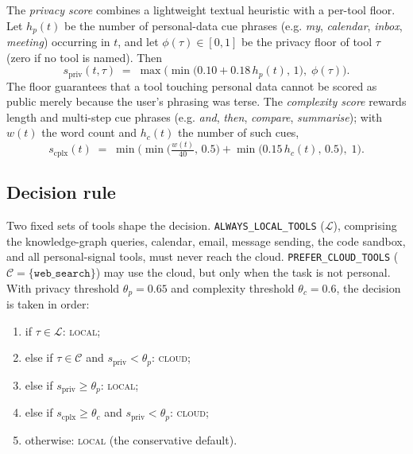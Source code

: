 \documentclass{ecai}
\begin{document}
The \emph{privacy score} combines a lightweight textual heuristic with a
per-tool floor. Let $h_p(t)$ be the number of personal-data cue phrases (e.g.
\emph{my}, \emph{calendar}, \emph{inbox}, \emph{meeting}) occurring in $t$, and
let $\phi(\tau)\in[0,1]$ be the privacy floor of tool $\tau$ (zero if no tool is
named). Then
%
\begin{equation}\label{eq:priv}
s_{\mathrm{priv}}(t,\tau) \;=\;
\max\!\Big(\min\big(0.10 + 0.18\,h_p(t),\,1\big),\; \phi(\tau)\Big).
\end{equation}
%
The floor guarantees that a tool touching personal data cannot be scored as
public merely because the user's phrasing was terse. The \emph{complexity score}
rewards length and multi-step cue phrases (e.g. \emph{and}, \emph{then},
\emph{compare}, \emph{summarise}); with $w(t)$ the word count and $h_c(t)$ the
number of such cues,
%
\begin{equation}\label{eq:cplx}
s_{\mathrm{cplx}}(t) \;=\;
\min\!\Big(\min\big(\tfrac{w(t)}{40},\,0.5\big)
        + \min\big(0.15\,h_c(t),\,0.5\big),\; 1\Big).
\end{equation}

\subsection{Decision rule}

Two fixed sets of tools shape the decision. \texttt{ALWAYS\_LOCAL\_TOOLS}
($\mathcal{L}$), comprising the knowledge-graph queries, calendar, email, message
sending, the code sandbox, and all personal-signal tools, must never reach
the cloud. \texttt{PREFER\_CLOUD\_TOOLS} ($\mathcal{C}=\{\texttt{web\_search}\}$)
may use the cloud, but only when the task is not personal. With privacy
threshold $\theta_p=0.65$ and complexity threshold $\theta_c=0.6$, the decision
is taken in order:

\begin{enumerate}[label=(\arabic*),noitemsep]
  \item if $\tau\in\mathcal{L}$: \textsc{local};
  \item else if $\tau\in\mathcal{C}$ and $s_{\mathrm{priv}}<\theta_p$:
        \textsc{cloud};
  \item else if $s_{\mathrm{priv}}\ge\theta_p$: \textsc{local};
  \item else if $s_{\mathrm{cplx}}\ge\theta_c$ and $s_{\mathrm{priv}}<\theta_p$:
        \textsc{cloud};
  \item otherwise: \textsc{local} (the conservative default).
\end{enumerate}
\end{document}
